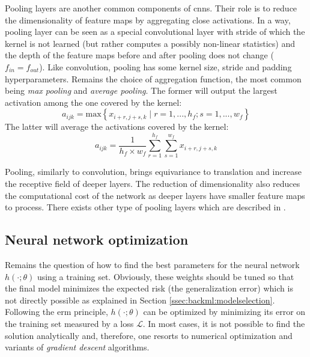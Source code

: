 Pooling layers are another common components of \acrshort{cnn}s. Their role is to reduce the dimensionality of feature maps by aggregating close activations. In a way, pooling layer can be seen as a special convolutional layer with stride of which the kernel is not learned (but rather computes a possibly non-linear statistics) and the depth of the feature maps before and after pooling does not change (\ie $f_{in} = f_{out}$). Like convolution, pooling has some kernel size, stride and padding hyperparameters. Remains the choice of aggregation function, the most common being \textit{max pooling} and \textit{average pooling}. The former will output the largest activation among the one covered by the kernel:
\begin{equation}
\label{eqn:backml:maxpooling}
a_{ijk} = \text{max} \left\{ x_{i+r,j+s,k} \mid r = 1, ..., h_f; s = 1, ..., w_f \right\}
\end{equation} 
The latter will average the activations covered by the kernel:
\begin{equation}
\label{eqn:backml:avgpooling}
a_{ijk} = \frac{1}{h_f \times w_f} \sum_{r=1}^{h_f} \sum_{s=1}^{w_f}  x_{i+r,j+s,k} 
\end{equation} 

Pooling, similarly to convolution, brings equivariance to translation and increase the receptive field of deeper layers. The reduction of dimensionality also reduces the computational cost of the network as deeper layers have smaller feature maps to process. There exists other type of pooling layers which are described in \parencite{gholamalinezhad2020pooling}.   

\subsection{Neural network optimization}
\label{ssec:backml:dl:opti}
Remains the question of how to find the best parameters for the neural network $h(\cdot; \theta)$ using a training set. Obviously, these weights should be tuned so that the final model minimizes the expected risk (\ie the generalization error) which is not directly possible as explained in Section \ref{ssec:backml:modelselection}. Following the \acrshort{erm} principle, $h(\cdot; \theta)$ can be optimized by minimizing its error on the training set measured by a loss $\mathcal{L}$. In most cases, it is not possible to find the solution analytically and, therefore, one resorts to numerical optimization and variants of \textit{gradient descent} algorithms.

